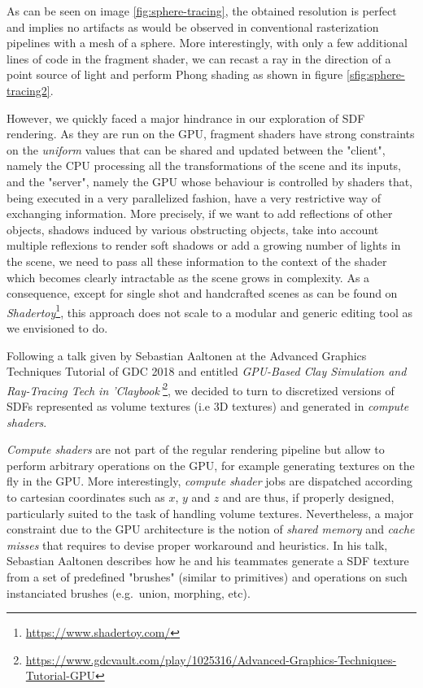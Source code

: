 \documentclass[10pt,a4paper,english, twocolumn]{article}
\begin{document}
As can be seen on image \ref{fig:sphere-tracing}, the obtained resolution is perfect and implies no artifacts as would be observed in conventional rasterization pipelines with a mesh of a sphere. More interestingly, with only a few additional lines of code in the fragment shader, we can recast a ray in the direction of a point source of light and perform Phong shading as shown in figure \ref{sfig:sphere-tracing2}.

However, we quickly faced a major hindrance in our exploration of SDF rendering. As they are run on the GPU, fragment shaders have strong constraints on the \textit{uniform} values that can be shared and updated between the "client", namely the CPU processing all the transformations of the scene and its inputs, and the "server", namely the GPU whose behaviour is controlled by shaders that, being executed in a very parallelized fashion, have a very restrictive way of exchanging information. More precisely, if we want to add reflections of other objects, shadows induced by various obstructing objects, take into account multiple reflexions to render soft shadows or add a growing number of lights in the scene, we need to pass all these information to the context of the shader which becomes clearly intractable as the scene grows in complexity. As a consequence, except for single shot and handcrafted scenes as can be found on \textit{Shadertoy}\footnote{\url{https://www.shadertoy.com/}}, this approach does not scale to a modular and generic editing tool as we envisioned to do.

Following a talk given by Sebastian Aaltonen at the Advanced Graphics Techniques Tutorial of GDC 2018 and entitled \textit{GPU-Based Clay Simulation and Ray-Tracing Tech in 'Claybook'}\footnote{\url{https://www.gdcvault.com/play/1025316/Advanced-Graphics-Techniques-Tutorial-GPU}}, we decided to turn to discretized versions of SDFs represented as volume textures (i.e 3D textures) and generated in \textit{compute shaders}.

\textit{Compute shaders} are not part of the regular rendering pipeline but allow to perform arbitrary operations on the GPU, for example generating textures on the fly in the GPU. More interestingly, \textit{compute shader} jobs are dispatched according to cartesian coordinates such as $x$, $y$ and $z$ and are thus, if properly designed, particularly suited to the task of handling volume textures. Nevertheless, a major constraint due to the GPU architecture is the notion of \textit{shared memory} and \textit{cache misses} that requires to devise proper workaround and heuristics. In his talk, Sebastian Aaltonen describes how he and his teammates generate a SDF texture from a set of predefined "brushes" (similar to primitives) and operations on such instanciated brushes (e.g.\ union, morphing, etc).
\end{document}
